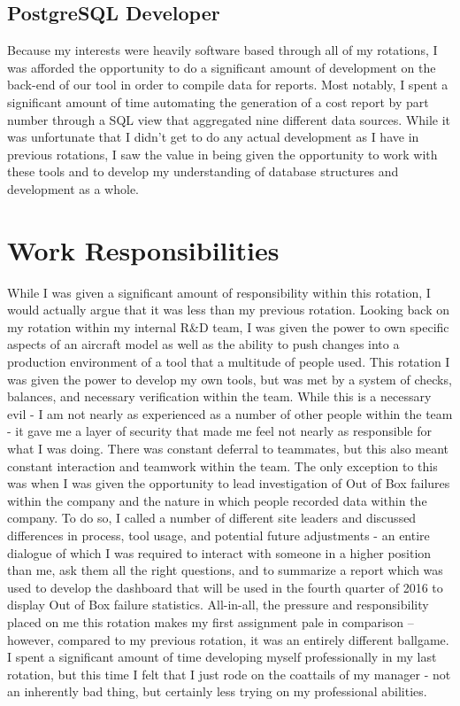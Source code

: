 \documentclass{article}
\begin{document}
\subsection{PostgreSQL Developer}
Because my interests were heavily software based through all of my rotations, I was afforded the opportunity to do a significant amount of development on the back-end of our tool in order to compile data for reports. Most notably, I spent a significant amount of time automating the generation of a cost report by part number through a SQL view that aggregated nine different data sources.
While it was unfortunate that I didn't get to do any actual development as I have in previous rotations, I saw the value in being given the opportunity to work with these tools and to develop my understanding of database structures and development as a whole.

\section{Work Responsibilities}
While I was given a significant amount of responsibility within this rotation, I would actually argue that it was less than my previous rotation. Looking back on my rotation within my internal R\&D team, I was given the power to own specific aspects of an aircraft model as well as the ability to push changes into a production environment of a tool that a multitude of people used.
This rotation I was given the power to develop my own tools, but was met by a system of checks, balances, and necessary verification within the team. While this is a necessary evil - I am not nearly as experienced as a number of other people within the team - it gave me a layer of security that made me feel not nearly as responsible for what I was doing. 
There was constant deferral to teammates, but this also meant constant interaction and teamwork within the team.
The only exception to this was when I was given the opportunity to lead investigation of Out of Box failures within the company and the nature in which people recorded data within the company. To do so, I called a number of different site leaders and discussed differences in process, tool usage, and potential future adjustments - an entire dialogue of which I was required to interact with someone in a higher position than me, ask them all the right questions, and to summarize a report which was used to develop the dashboard that will be used in the fourth quarter of 2016 to display Out of Box failure statistics.
All-in-all, the pressure and responsibility placed on me this rotation makes my first assignment pale in comparison -- however, compared to my previous rotation, it was an entirely different ballgame. I spent a significant amount of time developing myself professionally in my last rotation, but this time I felt that I just rode on the coattails of my manager - not an inherently bad thing, but certainly less trying on my professional abilities.
\end{document}
